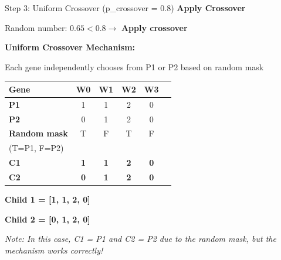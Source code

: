 \documentclass[aspectratio=169,10pt]{beamer}
\begin{document}
\begin{frame}{Step 3: Uniform Crossover (p\_crossover = 0.8)}
  \colorbox{navymid}{\color{teallt}\bfseries Apply Crossover}
  
  \vspace{0.3cm}
{\small Random number: $0.65 < 0.8 \rightarrow$ \textbf{Apply crossover \checkmark}}
  
  \vspace{0.3cm}
  \textbf{Uniform Crossover Mechanism:}
  
  {\small Each gene independently chooses from P1 or P2 based on random mask}

  \vspace{0.3cm}
  \centering
  \begin{tabular}{lccccc}
    \toprule
    \rowcolor{navymid}
    \color{white}\textbf{Gene} & \color{white}\textbf{W0} & \color{white}\textbf{W1} & \color{white}\textbf{W2} & \color{white}\textbf{W3} \\
    \midrule
    \cellcolor{teal}\color{white}\textbf{P1} & 1 & 1 & 2 & 0 \\
    \cellcolor{teal}\color{white}\textbf{P2} & 0 & 1 & 2 & 0 \\
    \midrule
    \textbf{Random mask} & T & F & T & F \\
    {\scriptsize (T=P1, F=P2)} & & & & \\
    \midrule
    \rowcolor{lightgreen}
    \cellcolor{mygreen}\color{white}\textbf{C1} & \textbf{1} & \textbf{1} & \textbf{2} & \textbf{0} \\
    \rowcolor{lightyellow}
    \cellcolor{amber}\color{white}\textbf{C2} & \textbf{0} & \textbf{1} & \textbf{2} & \textbf{0} \\
    \bottomrule
  \end{tabular}
  
  \vspace{0.3cm}
  \colorbox{mygreen}{\color{white}\bfseries Child 1 = [1, 1, 2, 0]}
  
  \colorbox{amber}{\color{white}\bfseries Child 2 = [0, 1, 2, 0]}
  
  \vspace{0.2cm}
  {\small\textit{Note: In this case, C1 = P1 and C2 = P2 due to the random mask, but the mechanism works correctly!}}
\end{frame}
\end{document}
